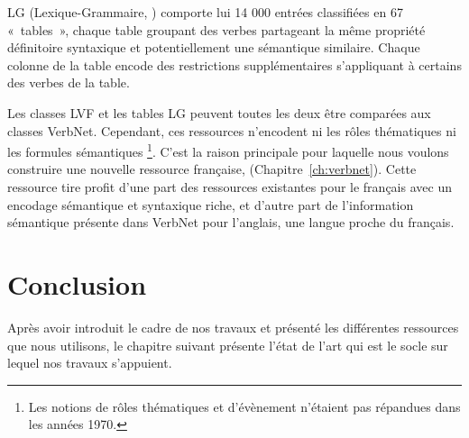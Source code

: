 
LG (Lexique-Grammaire, \cite{gross1975methodes,boons1976structure}) comporte
lui 14 000 entrées classifiées en 67 «~tables~», chaque table groupant des
verbes partageant la même propriété définitoire syntaxique et potentiellement
une sémantique similaire. Chaque colonne de la table encode des restrictions
supplémentaires s'appliquant à certains des verbes de la table.



Les classes LVF et les tables LG peuvent toutes les deux être comparées aux
classes VerbNet. Cependant, ces ressources n'encodent ni les rôles thématiques
ni les formules sémantiques \footnote{Les notions de rôles thématiques et
d'évènement n'étaient pas répandues dans les années 1970.}.  C'est la raison
principale pour laquelle nous voulons construire une nouvelle ressource
française, \verbenet{} (Chapitre~\ref{ch:verbnet}). Cette ressource tire profit
d'une part des ressources existantes pour le français avec un encodage
sémantique et syntaxique riche, et d'autre part de l'information sémantique
présente dans VerbNet pour l'anglais, une langue proche du français.

\section*{Conclusion}

Après avoir introduit le cadre de nos travaux et présenté les différentes
ressources que nous utilisons, le chapitre suivant présente l'état de l'art qui
est le socle sur lequel nos travaux s'appuient.
